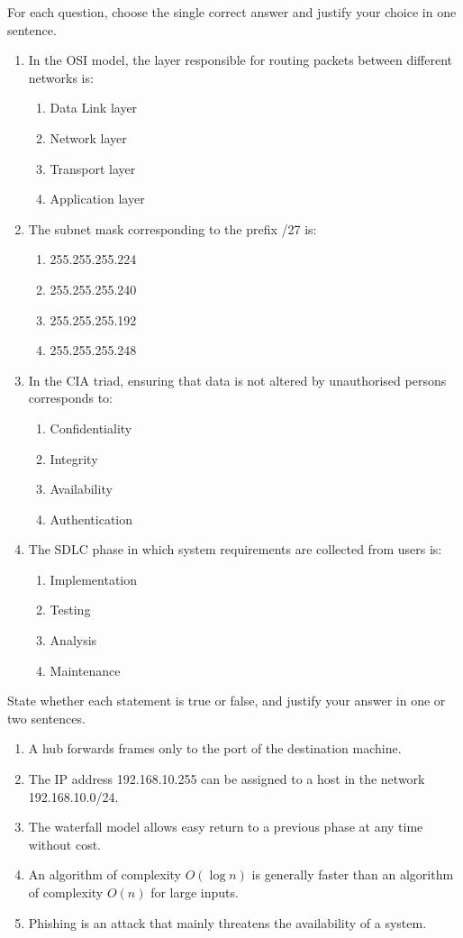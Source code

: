 \documentclass[11pt]{article}
\begin{document}
\begin{exercice}
For each question, choose the single correct answer and justify your choice in one sentence.
\begin{enumerate}
\item In the OSI model, the layer responsible for routing packets between different networks is:
\begin{enumerate}
\item Data Link layer
\item Network layer
\item Transport layer
\item Application layer
\end{enumerate}
\item The subnet mask corresponding to the prefix /27 is:
\begin{enumerate}
\item 255.255.255.224
\item 255.255.255.240
\item 255.255.255.192
\item 255.255.255.248
\end{enumerate}
\item In the CIA triad, ensuring that data is not altered by unauthorised persons corresponds to:
\begin{enumerate}
\item Confidentiality
\item Integrity
\item Availability
\item Authentication
\end{enumerate}
\item The SDLC phase in which system requirements are collected from users is:
\begin{enumerate}
\item Implementation
\item Testing
\item Analysis
\item Maintenance
\end{enumerate}
\end{enumerate}
\end{exercice}

\begin{exercice}
State whether each statement is true or false, and justify your answer in one or two sentences.
\begin{enumerate}
\item A hub forwards frames only to the port of the destination machine.
\item The IP address 192.168.10.255 can be assigned to a host in the network 192.168.10.0/24.
\item The waterfall model allows easy return to a previous phase at any time without cost.
\item An algorithm of complexity $O(\log n)$ is generally faster than an algorithm of complexity $O(n)$ for large inputs.
\item Phishing is an attack that mainly threatens the availability of a system.
\end{enumerate}
\end{exercice}
\end{document}
